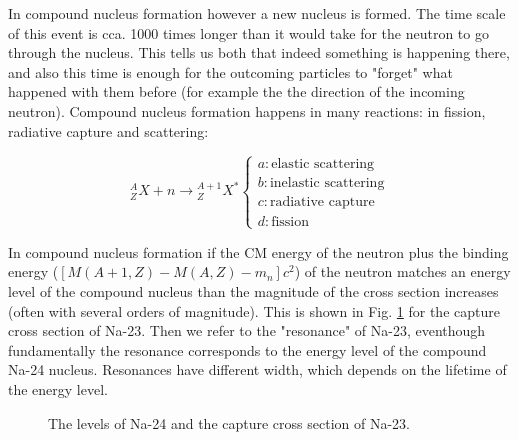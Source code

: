 In compound nucleus formation however a new nucleus is formed. The time scale of this event is cca. 1000 times longer than it would take for the neutron to go through the nucleus. This tells us both that indeed something is happening there, and also this time is enough for the outcoming particles to "forget" what happened with them before (for example the the direction of the incoming neutron). Compound nucleus formation happens in many reactions: in fission, radiative capture and scattering:

\begin{equation}
    {}_Z^AX + n \rightarrow {}_Z^{A+1}X^*
    \begin{cases}
      a: \text{elastic scattering} \\
      b: \text{inelastic scattering} \\
      c: \text{radiative capture} \\
      d: \text{fission}
    \end{cases}
\end{equation}
    
In compound nucleus formation if the CM energy of the neutron plus the binding energy ($[M(A+1,Z)-M(A,Z)-m_n]c^2$) of the neutron matches an energy level of the compound nucleus than the magnitude of the cross section increases (often with several orders of magnitude). This is shown in Fig. \ref{fig:nalevels} for the capture cross section of Na-23. Then we refer to the "resonance" of Na-23, eventhough fundamentally the resonance corresponds to the energy level of the compound Na-24 nucleus. Resonances have different width, which depends on the lifetime of the energy level.

\begin{figure}[ht!]
\protect {}\protect
\caption{\label{fig:nalevels} \footnotesize{The levels of Na-24 and the capture cross section of Na-23.}}
\end{figure}

